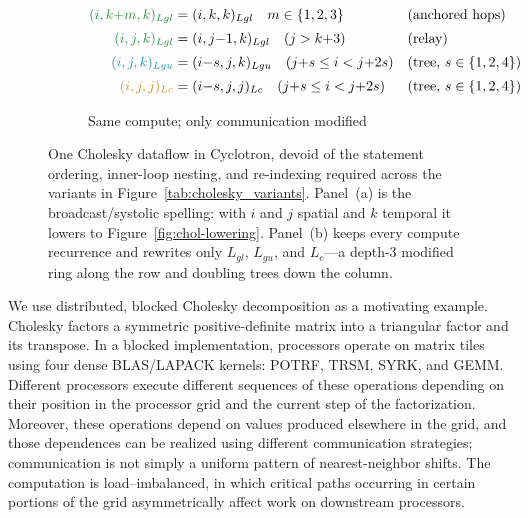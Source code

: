 \documentclass[sigplan, nonacm]{acmart}
\newenvironment{codepanel}{%
  \begin{lrbox}{\codepanelbox}%
  \begin{minipage}{\dimexpr\linewidth-8pt\relax}%
}{%
  \end{minipage}%
  \end{lrbox}%
  \setlength{\fboxsep}{4pt}%
  \colorbox{codebg}{\usebox{\codepanelbox}}%
}
\begin{document}
\begin{figure}[t]
\begin{subfigure}[t]{\linewidth}
\centering
\scriptsize
\begin{codepanel}
\begin{minipage}{\linewidth}
\raggedright
\noindent
\(\displaystyle
\begin{aligned}
\color{commhop}
(i, k{+}m, k)_{Lgl}
&= (i, k, k)_{Lgl}
\quad m\in\{1,2,3\}
&& \text{(anchored hops)} \\[0.2em]
\color{commhop}
(i, j, k)_{Lgl}
&= (i, j{-}1, k)_{Lgl}
\quad (j > k{+}3)
&& \text{(relay)} \\[0.2em]
\color{commtree}
(i, j, k)_{Lgu}
&= (i{-}s, j, k)_{Lgu}
\quad (j{+}s \le i < j{+}2s)
&& \text{(tree, } s\in\{1,2,4\}) \\[0.2em]
\color{commfact}
(i, j, j)_{Lc}
&= (i{-}s, j, j)_{Lc}
\quad (j{+}s \le i < j{+}2s)
&& \text{(tree, } s\in\{1,2,4\})
\end{aligned}
\)
\end{minipage}
\end{codepanel}
\caption{Same compute; only communication modified}
\label{fig:chol-dataflow-alt}
\end{subfigure}

\caption{One Cholesky dataflow in Cyclotron, devoid of the statement
ordering, inner-loop nesting, and re-indexing required across the variants
in Figure~\ref{tab:cholesky_variants}. Panel~(a) is the broadcast/systolic
spelling: with $i$ and $j$ spatial and $k$ temporal it lowers to
Figure~\ref{fig:chol-lowering}. Panel~(b) keeps every compute recurrence
and rewrites only $L_{gl}$, $L_{gu}$, and $L_c$---a depth-3 modified ring
along the row and doubling trees down the column.}
\label{fig:tensor_constraints}
\end{figure}

We use distributed, blocked Cholesky decomposition as a motivating example.
Cholesky factors a symmetric positive-definite matrix into a triangular factor and its transpose.
 In a blocked implementation, processors operate on matrix tiles using four dense BLAS/LAPACK kernels:
  POTRF, TRSM, SYRK, and GEMM. Different processors execute different sequences of these operations 
  depending on their position in the processor grid and the current step of the factorization.
  Moreover, these operations depend on values produced elsewhere in the grid, and
  those dependences can be realized using different communication strategies; 
  communication is not simply a uniform pattern of nearest-neighbor shifts. The computation is load--imbalanced, in which critical paths occurring in certain portions of the grid asymmetrically affect work on downstream processors.
\end{document}
